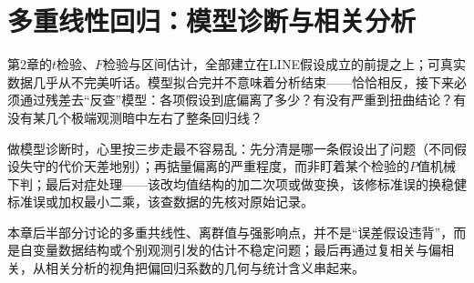 \chapter{多重线性回归：模型诊断与相关分析}
第2章的$t$检验、$F$检验与区间估计，全部建立在LINE假设成立的前提之上；可真实数据几乎从不完美听话。模型拟合完并不意味着分析结束——恰恰相反，接下来必须通过残差去“反查”模型：各项假设到底偏离了多少？有没有严重到扭曲结论？有没有某几个极端观测暗中左右了整条回归线？

做模型诊断时，心里按三步走最不容易乱：先分清是哪一条假设出了问题（不同假设失守的代价天差地别）；再掂量偏离的严重程度，而非盯着某个检验的$P$值机械下判；最后对症处理——该改均值结构的加二次项或做变换，该修标准误的换稳健标准误或加权最小二乘，该查数据的先核对原始记录。

本章后半部分讨论的多重共线性、离群值与强影响点，并不是“误差假设违背”，而是自变量数据结构或个别观测引发的估计不稳定问题；最后再通过复相关与偏相关，从相关分析的视角把偏回归系数的几何与统计含义串起来。

